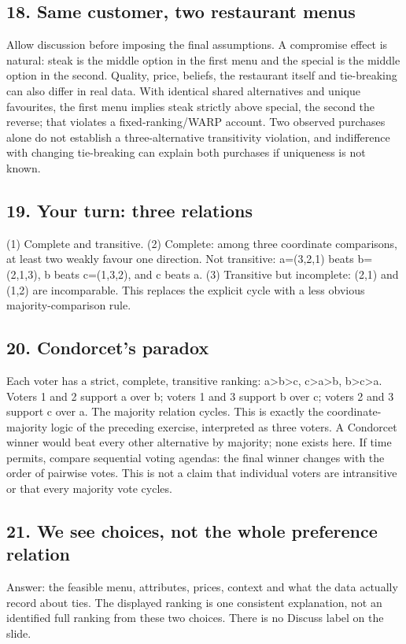 \documentclass[11pt,a4paper]{article}
\begin{document}
\subsection*{18. Same customer, two restaurant menus}
Allow discussion before imposing the final assumptions. A compromise effect is natural: steak is the middle option in the first menu and the special is the middle option in the second. Quality, price, beliefs, the restaurant itself and tie-breaking can also differ in real data. With identical shared alternatives and unique favourites, the first menu implies steak strictly above special, the second the reverse; that violates a fixed-ranking/WARP account. Two observed purchases alone do not establish a three-alternative transitivity violation, and indifference with changing tie-breaking can explain both purchases if uniqueness is not known.

\subsection*{19. Your turn: three relations}
(1) Complete and transitive. (2) Complete: among three coordinate comparisons, at least two weakly favour one direction. Not transitive: a=(3,2,1) beats b=(2,1,3), b beats c=(1,3,2), and c beats a. (3) Transitive but incomplete: (2,1) and (1,2) are incomparable. This replaces the explicit cycle with a less obvious majority-comparison rule.

\subsection*{20. Condorcet's paradox}
Each voter has a strict, complete, transitive ranking: a>b>c, c>a>b, b>c>a. Voters 1 and 2 support a over b; voters 1 and 3 support b over c; voters 2 and 3 support c over a. The majority relation cycles. This is exactly the coordinate-majority logic of the preceding exercise, interpreted as three voters. A Condorcet winner would beat every other alternative by majority; none exists here. If time permits, compare sequential voting agendas: the final winner changes with the order of pairwise votes. This is not a claim that individual voters are intransitive or that every majority vote cycles.

\subsection*{21. We see choices, not the whole preference relation}
Answer: the feasible menu, attributes, prices, context and what the data actually record about ties. The displayed ranking is one consistent explanation, not an identified full ranking from these two choices. There is no Discuss label on the slide.
\end{document}
